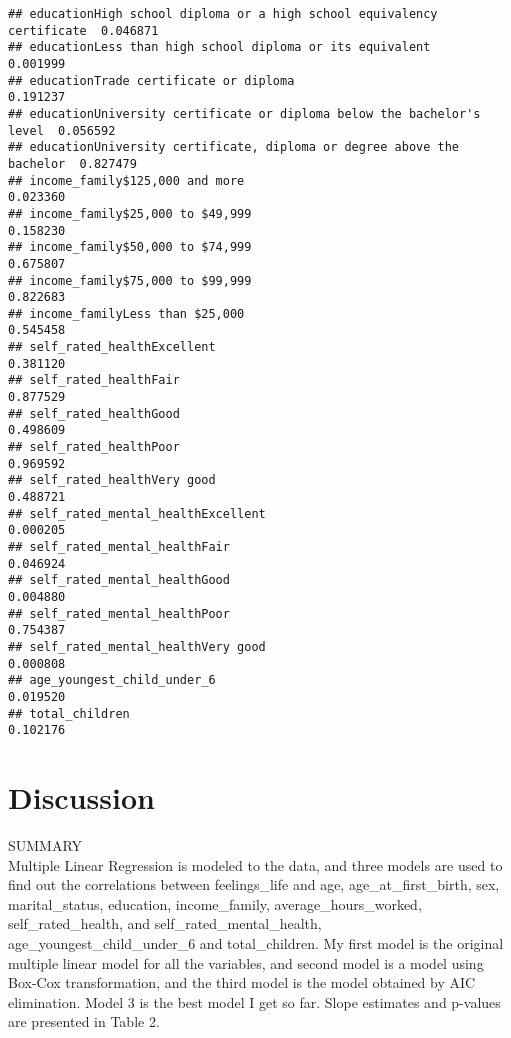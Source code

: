 \documentclass[
]{article}
\begin{document}
\begin{verbatim}
## educationHigh school diploma or a high school equivalency certificate  0.046871
## educationLess than high school diploma or its equivalent               0.001999
## educationTrade certificate or diploma                                  0.191237
## educationUniversity certificate or diploma below the bachelor's level  0.056592
## educationUniversity certificate, diploma or degree above the bachelor  0.827479
## income_family$125,000 and more                                         0.023360
## income_family$25,000 to $49,999                                        0.158230
## income_family$50,000 to $74,999                                        0.675807
## income_family$75,000 to $99,999                                        0.822683
## income_familyLess than $25,000                                         0.545458
## self_rated_healthExcellent                                             0.381120
## self_rated_healthFair                                                  0.877529
## self_rated_healthGood                                                  0.498609
## self_rated_healthPoor                                                  0.969592
## self_rated_healthVery good                                             0.488721
## self_rated_mental_healthExcellent                                      0.000205
## self_rated_mental_healthFair                                           0.046924
## self_rated_mental_healthGood                                           0.004880
## self_rated_mental_healthPoor                                           0.754387
## self_rated_mental_healthVery good                                      0.000808
## age_youngest_child_under_6                                             0.019520
## total_children                                                         0.102176
\end{verbatim}

\hypertarget{discussion}{%
\section{Discussion}\label{discussion}}

SUMMARY\\
Multiple Linear Regression is modeled to the data, and three models are
used to find out the correlations between feelings\_life and age,
age\_at\_first\_birth, sex, marital\_status, education, income\_family,
average\_hours\_worked, self\_rated\_health, and
self\_rated\_mental\_health, age\_youngest\_child\_under\_6 and
total\_children. My first model is the original multiple linear model
for all the variables, and second model is a model using Box-Cox
transformation, and the third model is the model obtained by AIC
elimination. Model 3 is the best model I get so far. Slope estimates and
p-values are presented in Table 2.\\
\end{document}
